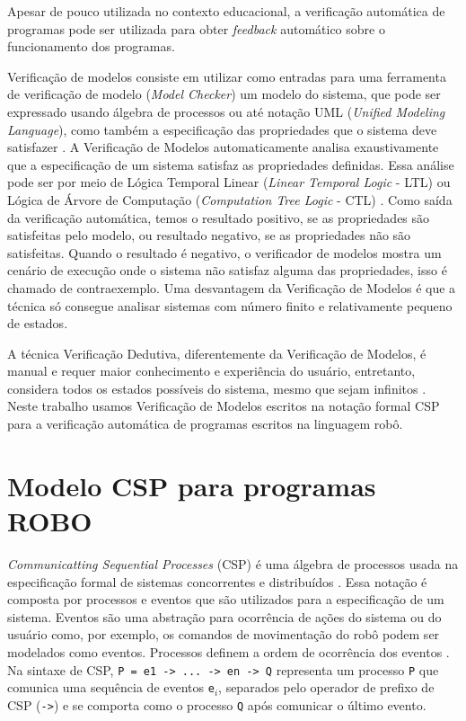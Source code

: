 
Apesar de pouco utilizada no contexto educacional, a verificação automática de programas pode ser utilizada para obter \textit{feedback} automático sobre o funcionamento dos programas. 

Verificação de modelos consiste em utilizar como entradas para uma ferramenta de verificação de modelo (\textit{Model Checker}) um modelo do sistema, que pode ser expressado usando álgebra de processos ou até notação UML (\textit{Unified Modeling Language}), como também a especificação das propriedades que o sistema deve satisfazer \cite{FEIGN}. A Verificação de Modelos automaticamente analisa exaustivamente que a especificação de um sistema satisfaz as propriedades definidas. Essa análise pode ser por meio de Lógica Temporal Linear (\textit{Linear Temporal Logic} - LTL) ou Lógica de Árvore de Computação (\textit{Computation Tree Logic} - CTL) \cite{ZHAO2014}. Como saída da verificação automática, temos o resultado positivo, se as propriedades são satisfeitas pelo modelo, ou resultado negativo, se as propriedades não são satisfeitas. Quando o resultado é negativo, o verificador de modelos mostra um cenário de execução onde o sistema não satisfaz alguma das propriedades, isso é chamado de contraexemplo. Uma desvantagem da Verificação de Modelos é que a técnica só consegue analisar sistemas com número finito e relativamente pequeno de estados. 

A técnica Verificação Dedutiva, diferentemente da Verificação de Modelos, é manual e requer maior conhecimento e experiência do usuário, entretanto, considera todos os estados possíveis do sistema, mesmo que sejam infinitos \cite{FEIGN}. Neste trabalho usamos Verificação de Modelos escritos na notação formal CSP para a verificação automática de programas escritos na linguagem robô.

\section{Modelo CSP para programas ROBO}
\label{sec:csp}
\textit{Communicatting Sequential Processes} (CSP) é uma álgebra de processos usada na especificação formal de sistemas concorrentes e distribuídos \cite{Cleaveland2018}. Essa notação é composta por processos e eventos que são utilizados para a especificação de um sistema. Eventos são uma abstração para ocorrência de ações do sistema ou do usuário como, por exemplo, os comandos de movimentação do robô podem ser modelados como eventos. Processos definem a ordem de ocorrência dos eventos \cite{Roscoe2010}. Na sintaxe de CSP, \texttt{P = e1 -> ... -> en -> Q} representa um processo \texttt{P} que comunica uma sequência de eventos \texttt{e$_i$}, separados pelo operador de prefixo de CSP (\texttt{->}) e se comporta como o processo \texttt{Q} após comunicar o último evento.

